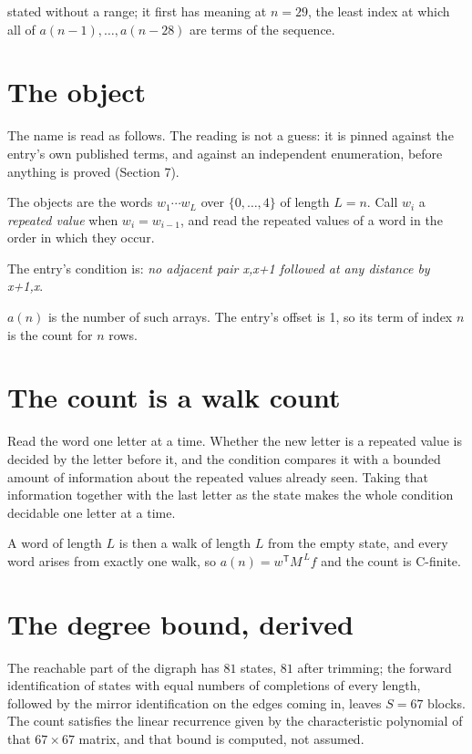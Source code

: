 \documentclass[11pt]{article}
\theoremstyle{definition}
\begin{document}
stated without a range; it first has meaning at $n = 29$, the least index at which all of $a(n-1),\dots,a(n-28)$ are terms of the sequence.

\section{The object}

The name is read as follows. The reading is not a guess: it is pinned against the entry's own published terms, and against an independent enumeration, before anything is proved (Section 7).

The objects are the words $w_1\cdots w_L$ over $\{0,\dots,4\}$ of length $L = n$. Call $w_i$ a {\itshape repeated value} when $w_i = w_{i-1}$, and read the repeated values of a word in the order in which they occur.

The entry's condition is: {\itshape no adjacent pair x,x+1 followed at any distance by x+1,x}.

$a(n)$ is the number of such arrays. The entry's offset is 1, so its term of index $n$ is the count for $n$ rows.

\section{The count is a walk count}

Read the word one letter at a time. Whether the new letter is a repeated value is decided by the letter before it, and the condition compares it with a bounded amount of information about the repeated values already seen. Taking that information together with the last letter as the state makes the whole condition decidable one letter at a time.

A word of length $L$ is then a walk of length $L$ from the empty state, and every word arises from exactly one walk, so $a(n) = w^{\mathsf T}M^{\,L}f$ and the count is C-finite.

\section{The degree bound, derived}

The reachable part of the digraph has $81$ states, $81$ after trimming; the forward identification of states with equal numbers of completions of every length, followed by the mirror identification on the edges coming in, leaves $S = 67$ blocks. The count satisfies the linear recurrence given by the characteristic polynomial of that $67\times67$ matrix, and that bound is computed, not assumed.
\end{document}

